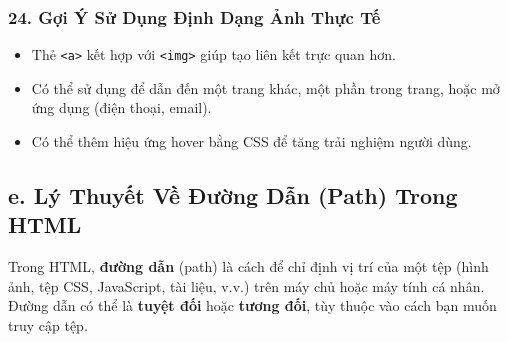 \documentclass[11pt,oneside]{book}
\newcommand{\thd}[1]{\textcolor{white}{\textbf{\strut #1}}}
\newcommand{\codeinline}[1]{\textcolor{accentOrange}{\texttt{#1}}}
\begin{document}
\subsubsection{24. Gợi Ý Sử Dụng Định Dạng Ảnh Thực Tế}

\begin{prettyTableBox}
\end{prettyTableBox}

\begin{conceptBox}
\begin{itemize}[leftmargin=1.5em, itemsep=3pt, parsep=0pt]
    \item Thẻ \codeinline{<a>} kết hợp với \codeinline{<img>} giúp tạo liên kết trực quan hơn.
    \item Có thể sử dụng để dẫn đến một trang khác, một phần trong trang, hoặc mở ứng dụng (điện thoại, email).
    \item Có thể thêm hiệu ứng hover bằng CSS để tăng trải nghiệm người dùng.
\end{itemize}
\end{conceptBox}



\subsection{e. Lý Thuyết Về Đường Dẫn (Path) Trong HTML}

Trong HTML, \textbf{đường dẫn} (path) là cách để chỉ định vị trí của một tệp (hình ảnh, tệp CSS, JavaScript, tài liệu, v.v.) trên máy chủ hoặc máy tính cá nhân. Đường dẫn có thể là \textbf{tuyệt đối} hoặc \textbf{tương đối}, tùy thuộc vào cách bạn muốn truy cập tệp.
\end{document}

